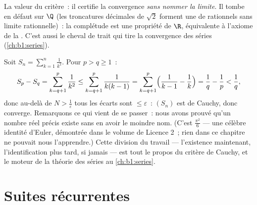 \begin{remark}
La valeur du critère~: il certifie la convergence \emph{sans nommer
la limite}. Il tombe en défaut sur $\Q$ (les troncatures décimales de
$\sqrt 2$ forment une  de rationnels sans limite
rationnelle)~: la complétude est une propriété de $\R$, équivalente à
l'axiome de la . C'est aussi le cheval de trait qui
tire la convergence des séries (\cref{ch:b1:series}).
\end{remark}

\begin{example}\label{ex:b1:seq:basel}
Soit $S_n = \sum_{k=1}^{n} \frac{1}{k^2}$. Pour $p > q \geq 1$~:
\[
S_p - S_q = \sum_{k=q+1}^{p} \frac{1}{k^2}
\leq \sum_{k=q+1}^{p} \frac{1}{k(k-1)}
= \sum_{k=q+1}^{p} \Bigl(\frac{1}{k-1} - \frac 1k\Bigr)
= \frac 1q - \frac 1p < \frac 1q ,
\]
donc au-delà de $N > \frac1\varepsilon$ tous les écarts sont $\leq
\varepsilon$~: $(S_n)$ est de Cauchy, donc converge. Remarquons ce
qui vient de se passer~: nous avons prouvé qu'un nombre réel précis
existe sans en avoir le moindre nom. (C'est $\frac{\pi^2}{6}$ --- une
célèbre identité d'Euler, démontrée dans le volume de Licence 2~;
rien dans ce chapitre ne pouvait nous l'apprendre.) Cette division du
travail --- l'existence maintenant, l'identification plus tard, si
jamais --- est tout le propos du critère de Cauchy, et le moteur de
la théorie des séries au \cref{ch:b1:series}.
\end{example}

\section{Suites récurrentes}

